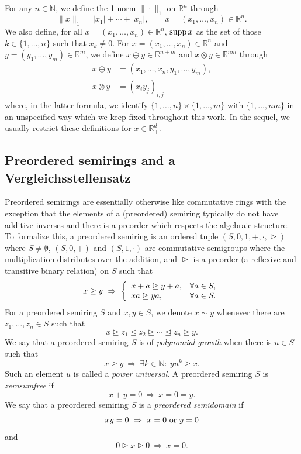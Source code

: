 \documentclass[12pt,a4paper,reqno]{amsart}
\newcommand{\rleq}{\trianglelefteq}
\newcommand{\rgeq}{\trianglerighteq}
\theoremstyle{definition}
\newcommand{\N}{\mathbb N}
\newcommand{\R}{\mathbb R}
\let\originalleft\left
\let\originalright\right
\renewcommand{\left}{\mathopen{}\mathclose\bgroup\originalleft}
\renewcommand{\right}{\aftergroup\egroup\originalright}
\begin{document}
For any $n\in\N$, we define the 1-norm $\|\cdot\|_1$ on $\R^n$ through
$$
\|x\|_1=|x_1|+\cdots+|x_n|,\qquad x=(x_1,\ldots,x_n)\in\R^n.
$$
We also define, for all $x=(x_1,\ldots,x_n)\in\R^n$, ${\rm supp}\,x$ as the set of those $k\in\{1,\ldots,n\}$ such that $x_k\neq0$. For $x=(x_1,\ldots,x_n)\in\R^n$ and $y=(y_1,\ldots,y_m)\in\R^m$, we define $x\oplus y\in\R^{n+m}$ and $x\otimes y\in\R^{nm}$ through
\begin{align*}
x\oplus y&=(x_1,\ldots,x_n,y_1,\ldots,y_m),\\
x\otimes y&=(x_iy_j)_{i,j}
\end{align*}
where, in the latter formula, we identify $\{1,\ldots,n\}\times\{1,\ldots,m\}$ with $\{1,\ldots,nm\}$ in an unspecified way which we keep fixed throughout this work. In the sequel, we usually restrict these definitions for $x\in\R_+^d$.

\subsection{Preordered semirings and a Vergleichsstellensatz}

Preordered semirings are essentially otherwise like commutative rings with the exception that the elements of a (preordered) semiring typically do not have additive inverses and there is a preorder which respects the algebraic structure. To formalize this, a preordered semiring is an ordered tuple $(S,0,1,+,\cdot,\rgeq)$ where $S\neq\emptyset$, $(S,0,+)$ and $(S,1,\cdot)$ are commutative semigroups where the multiplication distributes over the addition, and $\rgeq$ is a preorder (a reflexive and transitive binary relation) on $S$ such that
$$
x\rgeq y\ \Rightarrow\ \left\{\begin{array}{ll}
x+a\rgeq y+a,&\forall a\in S,\\
xa\rgeq ya,&\forall a\in S.
\end{array}\right.
$$
For a preordered semiring $S$ and $x,y\in S$, we denote $x\sim y$ whenever there are $z_1,\ldots,z_n\in S$ such that
$$
x\rgeq z_1\rleq z_2\rgeq\cdots\rleq z_n\rgeq y.
$$
We say that a preordered semiring $S$ is of {\it polynomial growth} when there is $u\in S$ such that
$$
x\rgeq y\ \Rightarrow\ \exists k\in\N:\ yu^k\rgeq x.
$$
Such an element $u$ is called a {\it power universal}. A preordered semiring $S$ is {\it zerosumfree} if
$$
x+y=0\ \Rightarrow\ x=0=y.
$$
We say that a preordered semiring $S$ is a {\it preordered semidomain} if
$$
xy=0\ \Rightarrow\ x=0\ {\rm or}\ y=0
$$
and
$$
0\rgeq x\rgeq 0\ \Rightarrow\ x=0.
$$
\end{document}
